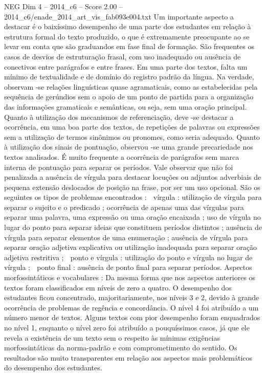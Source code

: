 \begin{textsample}{NEG Dim 4 – 2014\_c6 – Score 2.00 – 2014\_c6/enade\_2014\_art\_vis\_fab093e004.txt}
Um importante aspecto a destacar é o baixíssimo desempenho de uma parte dos estudantes em relação à estrutura formal do texto produzido, o que é extremamente preocupante ao se levar em conta que são graduandos em fase final de formação.
São frequentes os casos de desvios de estruturação frasal, com uso inadequado ou ausência de conectivos entre parágrafos e entre frases.
Em uma parte dos textos, falta um mínimo de textualidade e de domínio do registro padrão da língua.
Na verdade, observam -se relações linguísticas quase agramaticais, como as estabelecidas pela sequência de gerúndios sem o apoio de um ponto de partida para a organização das informações gramaticais e semânticas, ou seja, sem uma oração principal.
Quanto à utilização dos mecanismos de referenciação, deve -se destacar a ocorrência, em uma boa parte dos textos, de repetições de palavras ou expressões sem a utilização de termos sinônimos ou pronomes, como seria adequado.
Quanto à utilização dos sinais de pontuação, observou -se uma grande precariedade nos textos analisados.
É muito frequente a ocorrência de parágrafos sem marca interna de pontuação para separar os períodos.
Vale observar que não foi penalizada a ausência de vírgula para destacar locuções ou adjuntos adverbiais de pequena extensão deslocados de posição na frase, por ser um uso opcional.
São os seguintes os tipos de problemas encontrados :  vírgula : utilização de vírgula para separar o sujeito e o predicado ; ocorrência de apenas uma das vírgulas para separar uma palavra, uma expressão ou uma oração encaixada ; uso de vírgula no lugar do ponto para separar ideias que constituem períodos distintos ; ausência de vírgula para separar elementos de uma enumeração ; ausência de vírgula para separar oração adjetiva explicativa ou utilização inadequada para separar oração adjetiva restritiva ;  ponto e vírgula : utilização do ponto e vírgula no lugar de vírgula ;  ponto final : ausência de ponto final para separar períodos.
Aspectos morfossintáticos e vocabulares : Da mesma forma que nos aspectos anteriores os textos foram classificados em níveis de zero a quatro.
O desempenho dos estudantes ficou concentrado, majoritariamente, nos níveis 3 e 2, devido à grande ocorrência de problemas de regência e concordância.
O nível 4 foi atribuído a um número menor de textos.
Alguns textos com pior desempenho foram enquadrados no nível 1, enquanto o nível zero foi atribuído a pouquíssimos casos, já que ele revela a existência de um texto sem o respeito às mínimas exigências morfossintáticas da norma-padrão e com comprometimento do sentido.
Os resultados são muito transparentes em relação aos aspectos mais problemáticos do desempenho dos estudantes.

\end{textsample}
